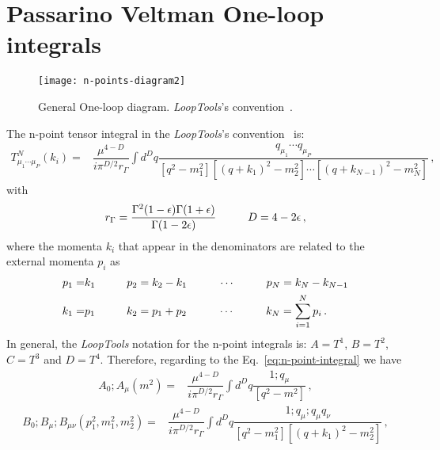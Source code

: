 \section{Passarino Veltman One-loop integrals}
\label{sec:passarino-veltman}

\begin{figure}[h]
\centering
\texttt{[image: n-points-diagram2]}
\caption{General One-loop diagram. \textit{LoopTools}'s convention~\cite{Hahn:1998yk}.}
\end{figure}

The n-point tensor integral in the \textit{LoopTools}'s convention~\cite{Hahn:1998yk} is:
\begin{align}
\label{eq:n-point-integral}
T^N_{\mu_{1}\cdots\mu_{P}}(k_i)=&\dfrac{\mu^{4-D}}{i\pi^{D/2}r_{\Gamma}}\int d^Dq \dfrac{q_{\mu_1}\cdots q_{\mu_P}}{[q^2-m_1^2][(q+k_1)^2-m_2^2]\cdots[(q+k_{N-1})^2-m_{N}^2]}\,,
\end{align} 
with
\begin{align}
r_{\Gamma}=\dfrac{\Gamma^2(1-\epsilon)\Gamma(1+\epsilon)}{\Gamma(1-2\epsilon)}\hspace{1.0 cm} D=4-2\epsilon \,,
\end{align} 
\label{eq:ptok}
where the momenta $k_i$ that appear in the denominators are related to the external momenta $p_i$ as
\begin{align}
p_1=& k_1 \hspace{1 cm} p_2=k_2-k_1 \hspace{1 cm} \cdots \hspace{1 cm} p_N=k_N-k_{N-1}\nonumber \\
k_1=& p_1 \hspace{1 cm} k_2=p_1+p_2 \hspace{1 cm} \cdots \hspace{1 cm} k_N=\sum_{i=1}^N p_i\,.
\end{align}
%
In general, the \textit{LoopTools} notation for the n-point integrals is: $A=T^1$, $B=T^2$, $C=T^3$ and $D=T^4$. Therefore, regarding to the Eq.~\eqref{eq:n-point-integral} we have
%
\begin{align}
\label{eq:A-point-integral}
A_0;A_{\mu}\left(m^2 \right)=&\dfrac{\mu^{4-D}}{i\pi^{D/2}r_{\Gamma}}\int d^Dq \dfrac{ 1;q_{\mu} }{[q^2-m^2]} \,,
\end{align} 
%
\begin{align}
\label{eq:B-point-integral}
B_0;B_{\mu};B_{\mu\nu}\left(p_1^2,m_1^2,m_2^2 \right) 
=&\dfrac{\mu^{4-D}}{i\pi^{D/2}r_{\Gamma}}\int d^Dq \dfrac{ 1;q_{\mu};q_{\mu}q_{\nu} }{[q^2-m_1^2][(q+k_1)^2-m_2^2]} \,,
\end{align} 
